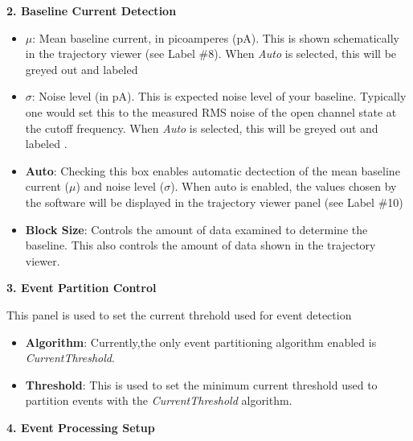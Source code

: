 \documentclass[letterpaper,10pt,english]{sphinxmanual}
\begin{document}
\textbf{2. Baseline Current Detection}
\begin{itemize}
\item {} 
\(\mu\): Mean baseline current, in picoamperes (pA). This is shown schematically in the trajectory viewer (see Label \#8). When \emph{Auto} is selected, this will be greyed out and labeled 

\item {} 
\(\sigma\): Noise level (in pA). This is expected noise level of your baseline. Typically one would set this to the measured RMS noise of the open channel state at the cutoff frequency. When \emph{Auto} is selected, this will be greyed out and labeled .

\item {} 
\textbf{Auto}: Checking this box enables automatic dectection of the mean baseline current (\(\mu\)) and noise level (\(\sigma\)). When auto is enabled, the values chosen by the software will be displayed in the trajectory viewer panel (see Label \#10)

\item {} 
\textbf{Block Size}: Controls the amount of data examined to determine the baseline. This also controls the amount of data shown in the trajectory viewer.

\end{itemize}

\textbf{3. Event Partition Control}

This panel is used to set the current threhold used for event detection
\begin{itemize}
\item {} 
\textbf{Algorithm}: Currently,the only event partitioning algorithm enabled is \emph{CurrentThreshold}.

\item {} 
\textbf{Threshold}: This is used to set the minimum current threshold used to partition events with the \emph{CurrentThreshold} algorithm.

\end{itemize}

\textbf{4.  Event Processing Setup}
\end{document}
